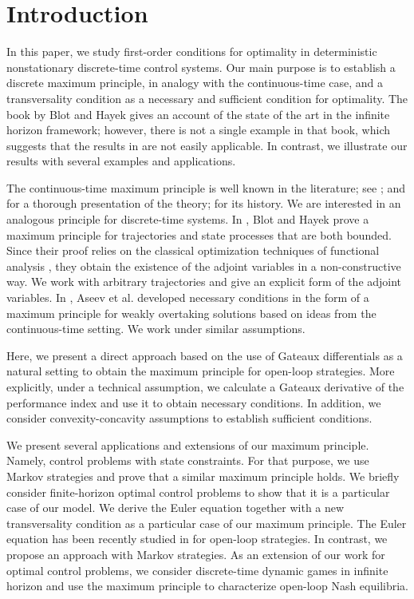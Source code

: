 \documentclass[3p]{elsarticle}
\begin{document}
	\section{Introduction}
	In this paper, we study first-order conditions for optimality in  deterministic nonstationary discrete-time control systems. Our main purpose is to establish a discrete maximum principle, in analogy with the continuous-time case, and a transversality condition as a necessary and sufficient condition for optimality.
	The book by Blot and Hayek \cite{Blot} gives an account of the state of the art in the infinite horizon framework; however, there is not a single example in that book, which suggests that the results in \cite{Blot} are not easily applicable. In contrast, we illustrate our results with several examples and applications.
	
	The continuous-time maximum principle is well known in the literature; see \cite{Pont}; \cite{Flemming} and \cite{Clarke} for a thorough presentation of the theory; \cite{HistoryMP} for its history. We are interested in an analogous principle for discrete-time systems. In \cite[Section 3.2.3]{Blot}, Blot and Hayek prove a maximum principle for trajectories and state processes that are both bounded. Since their proof relies on the classical optimization techniques of functional analysis \cite{Clarke,Lue}, they obtain the existence of the adjoint variables in a non-constructive way. We work with arbitrary trajectories and give an explicit form of the adjoint variables.
	In \cite{Multipliers}, 	Aseev et al. developed  necessary conditions in the form of a maximum principle for weakly overtaking solutions based on ideas from the continuous-time setting. We work under similar assumptions.
	
	Here, we present a direct approach based on the use of Gateaux differentials as a natural setting to obtain the maximum principle for open-loop strategies. More explicitly, under a technical assumption, we calculate a Gateaux derivative of the performance index and use it  to obtain necessary conditions. In addition, we consider convexity-concavity assumptions to establish sufficient conditions. 
	
	We present several applications and extensions of our maximum principle. Namely, control problems with state constraints. For that purpose, we use Markov strategies and prove that a similar maximum principle holds. We briefly consider finite-horizon optimal control problems to show that it is a particular case of our model.
	We derive the Euler equation together with a new transversality condition as a particular case of our maximum principle. The Euler equation has been recently studied in \cite{EEDavid} for open-loop strategies. In contrast, we propose an approach with Markov strategies. As an extension of our work for optimal control problems, we consider discrete-time dynamic games in infinite horizon and use the maximum principle to characterize open-loop Nash equilibria.
	
\end{document}
